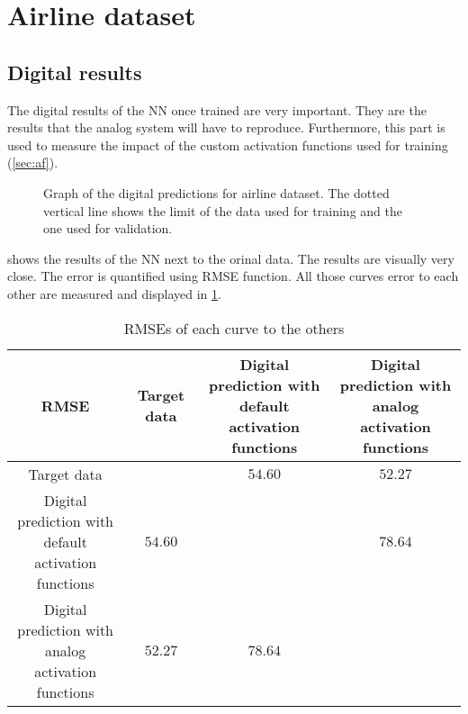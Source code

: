 \section{Airline dataset}
\label{sec:resAirline}

\subsection{Digital results}
\label{subsec:digitalAirline}

The digital results of the \ac{NN} once trained are very important. They are the results that the analog system will have to reproduce. Furthermore, this part is used to measure the impact of the custom activation functions used for training (\cref{sec:af}).

\begin{figure}[H]
  \centering
  
  \caption{Graph of the digital predictions for airline dataset. The dotted vertical line shows the limit of the data used for training and the one used for validation.}
  \label{graph:airlineDigital}
\end{figure}

 shows the results of the \ac{NN} next to the orinal data. The results are visually very close. The error is quantified using \ac{RMSE} function. All those curves error to each other are measured and displayed in \cref{tab:airlineDigital}.

\begin{table}[H]
  \centering
  \begin{tabular}{|c|c|c|c|}
    \hline
    \cellcolor[HTML]{808080}\acs{RMSE} & Target data & \specialcell{Digital prediction with\\default activation functions} & \specialcell{Digital prediction with\\analog activation functions}\\
    \hline
    Target data &\cellcolor[HTML]{202020} & $54.60$ & $52.27$\\
    \hline
    \specialcell{Digital prediction with\\default activation functions}  & $54.60$ & \cellcolor[HTML]{202020} & $78.64$\\
    \hline
    \specialcell{Digital prediction with\\analog activation functions} & $52.27$ & $78.64$ & \cellcolor[HTML]{202020}\\
    \hline
  \end{tabular}
  \caption{\acp{RMSE} of each curve to the others}
  \label{tab:airlineDigital}
\end{table}

